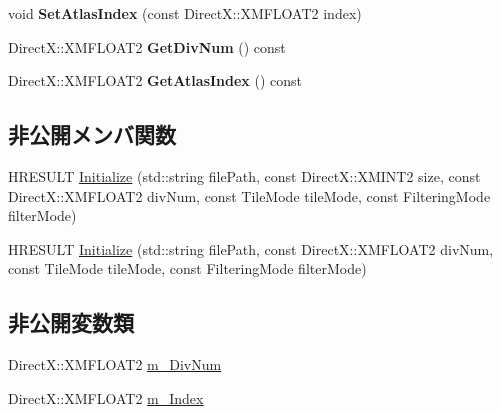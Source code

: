 \begin{DoxyCompactItemize}
\item 
void {\bfseries Set\+Atlas\+Index} (const Direct\+X\+::\+X\+M\+F\+L\+O\+A\+T2 index)\hypertarget{class_a_p_i_1_1_texture_atlas_a936129d1cf73f242c5e74f7b87be9168}{}\label{class_a_p_i_1_1_texture_atlas_a936129d1cf73f242c5e74f7b87be9168}

\item 
Direct\+X\+::\+X\+M\+F\+L\+O\+A\+T2 {\bfseries Get\+Div\+Num} () const \hypertarget{class_a_p_i_1_1_texture_atlas_ad95b8474f02c2100d2149ddbc85ba456}{}\label{class_a_p_i_1_1_texture_atlas_ad95b8474f02c2100d2149ddbc85ba456}

\item 
Direct\+X\+::\+X\+M\+F\+L\+O\+A\+T2 {\bfseries Get\+Atlas\+Index} () const \hypertarget{class_a_p_i_1_1_texture_atlas_ad20c9565d1aa6ca8b9a78ba50baaedc9}{}\label{class_a_p_i_1_1_texture_atlas_ad20c9565d1aa6ca8b9a78ba50baaedc9}

\end{DoxyCompactItemize}
\subsection*{非公開メンバ関数}
\begin{DoxyCompactItemize}
\item 
H\+R\+E\+S\+U\+LT \hyperlink{class_a_p_i_1_1_texture_atlas_aa4937eaead1a57cbf5bbc926adf01b23}{Initialize} (std\+::string file\+Path, const Direct\+X\+::\+X\+M\+I\+N\+T2 size, const Direct\+X\+::\+X\+M\+F\+L\+O\+A\+T2 div\+Num, const Tile\+Mode tile\+Mode, const Filtering\+Mode filter\+Mode)
\item 
H\+R\+E\+S\+U\+LT \hyperlink{class_a_p_i_1_1_texture_atlas_a50471fd5a53358b68143e27c2c3107e0}{Initialize} (std\+::string file\+Path, const Direct\+X\+::\+X\+M\+F\+L\+O\+A\+T2 div\+Num, const Tile\+Mode tile\+Mode, const Filtering\+Mode filter\+Mode)
\end{DoxyCompactItemize}
\subsection*{非公開変数類}
\begin{DoxyCompactItemize}
\item 
Direct\+X\+::\+X\+M\+F\+L\+O\+A\+T2 \hyperlink{class_a_p_i_1_1_texture_atlas_aa7382d61a1bd4e726d8f2730e07d92ed}{m\+\_\+\+Div\+Num}
\item 
Direct\+X\+::\+X\+M\+F\+L\+O\+A\+T2 \hyperlink{class_a_p_i_1_1_texture_atlas_ade24c54e9200934a5852b874df6bfaaf}{m\+\_\+\+Index}
\end{DoxyCompactItemize}


